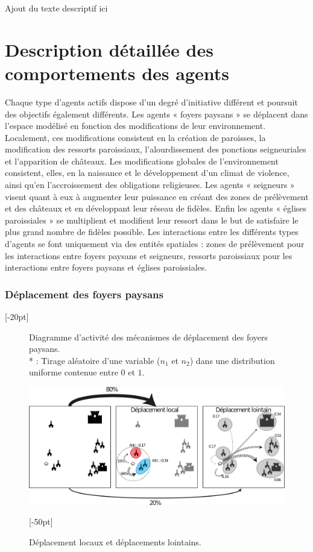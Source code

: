 {{Ajout du texte descriptif ici
}

	
\clearpage	
\section[Comportements des agents]{Description détaillée des comportements des agents}

Chaque type d'agents actifs dispose d'un degré d'initiative différent et poursuit des objectifs également différents.
Les agents « foyers paysans » se déplacent dans l'espace modélisé en fonction des modifications de leur environnement.
Localement, ces modifications consistent en la création de paroisses, la modification des ressorts paroissiaux, l'alourdissement des ponctions seigneuriales et l'apparition de châteaux.
Les modifications globales de l'environnement consistent, elles, en la naissance et le développement d'un climat de violence, ainsi qu'en l'accroissement des obligations religieuses.
Les agents « seigneurs » visent quant à eux à augmenter leur puissance en créant des zones de prélèvement et des châteaux et en développant leur réseau de fidèles.
Enfin les agents « églises paroissiales » se multiplient et modifient leur ressort dans le but de satisfaire le plus grand nombre de fidèles possible.
Les interactions entre les différents types d'agents se font uniquement via des entités spatiales : zones de prélèvement pour les interactions entre foyers paysans et seigneurs, ressorts paroissiaux pour les interactions entre foyers paysans et églises paroissiales.

\clearpage
\subsubsection{Déplacement des foyers paysans}[-20pt]

\begin{figure}[H]
	
	\caption{Diagramme d'activité des mécanismes de déplacement des foyers paysans.\\
		* : Tirage aléatoire d'une variable ($n_1$ et $n_2$) dans une distribution uniforme contenue entre $0$ et $1$.}
\end{figure}


\begin{figure}[H]
	\centering
	\includegraphics[width=1\linewidth]{img/Deplacement.png}
	\caption{Déplacement locaux et déplacements lointains.}
	[-50pt]
\end{figure}
\clearpage
}
